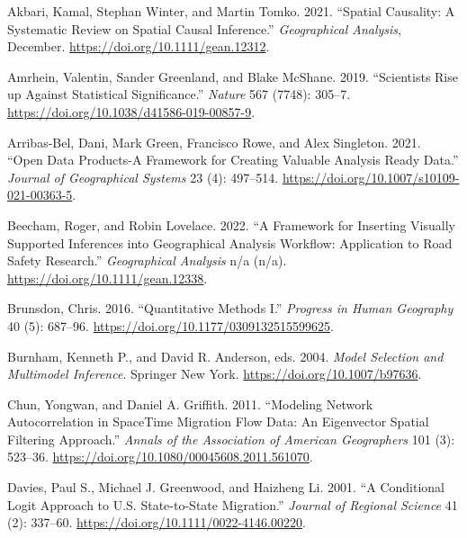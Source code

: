 \documentclass[11pt,letterpaper]{article}
\newlength{\cslhangindent}
\newlength{\cslentryspacingunit} %
\newenvironment{CSLReferences}[2] %
 {%
  \setlength{\parindent}{0pt}
  \ifodd #1
  \let\oldpar\par
  \def\par{\hangindent=\cslhangindent\oldpar}
  \fi
  \setlength{\parskip}{#2\cslentryspacingunit}
 }%
 {}
\begin{document}
\hypertarget{refs}{}
\begin{CSLReferences}{1}{0}
\leavevmode{}%
Akbari, Kamal, Stephan Winter, and Martin Tomko. 2021. {``Spatial Causality: A Systematic Review on Spatial Causal Inference.''} \emph{Geographical Analysis}, December. \url{https://doi.org/10.1111/gean.12312}.

\leavevmode{}%
Amrhein, Valentin, Sander Greenland, and Blake McShane. 2019. {``Scientists Rise up Against Statistical Significance.''} \emph{Nature} 567 (7748): 305--7. \url{https://doi.org/10.1038/d41586-019-00857-9}.

\leavevmode{}%
Arribas-Bel, Dani, Mark Green, Francisco Rowe, and Alex Singleton. 2021. {``Open Data Products-A Framework for Creating Valuable Analysis Ready Data.''} \emph{Journal of Geographical Systems} 23 (4): 497--514. \url{https://doi.org/10.1007/s10109-021-00363-5}.

\leavevmode{}%
Beecham, Roger, and Robin Lovelace. 2022. {``A Framework for Inserting Visually Supported Inferences into Geographical Analysis Workflow: Application to Road Safety Research.''} \emph{Geographical Analysis} n/a (n/a). \url{https://doi.org/10.1111/gean.12338}.

\leavevmode{}%
Brunsdon, Chris. 2016. {``Quantitative Methods I.''} \emph{Progress in Human Geography} 40 (5): 687--96. \url{https://doi.org/10.1177/0309132515599625}.

\leavevmode{}%
Burnham, Kenneth P., and David R. Anderson, eds. 2004. \emph{Model Selection and Multimodel Inference}. Springer New York. \url{https://doi.org/10.1007/b97636}.

\leavevmode{}%
Chun, Yongwan, and Daniel A. Griffith. 2011. {``Modeling Network Autocorrelation in Space{\textendash}Time Migration Flow Data: An Eigenvector Spatial Filtering Approach.''} \emph{Annals of the Association of American Geographers} 101 (3): 523--36. \url{https://doi.org/10.1080/00045608.2011.561070}.

\leavevmode{}%
Davies, Paul S., Michael J. Greenwood, and Haizheng Li. 2001. {``A Conditional Logit Approach to U.S. State{-}to{-}State Migration.''} \emph{Journal of Regional Science} 41 (2): 337--60. \url{https://doi.org/10.1111/0022-4146.00220}.


\end{CSLReferences}
\end{document}

